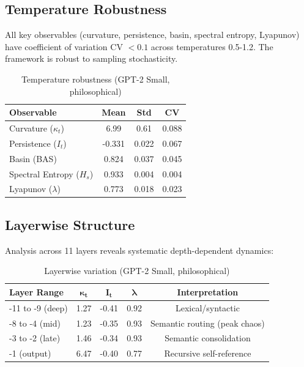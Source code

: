 \documentclass[12pt,a4paper]{article}
\begin{document}
\subsection{Temperature Robustness}

All key observables (curvature, persistence, basin, spectral entropy, Lyapunov) have coefficient of variation CV $< 0.1$ across temperatures 0.5-1.2. The framework is robust to sampling stochasticity.

\begin{table}[h]
\centering
\caption{Temperature robustness (GPT-2 Small, philosophical)}
\begin{tabular}{lccc}
\toprule
\textbf{Observable} & \textbf{Mean} & \textbf{Std} & \textbf{CV} \\
\midrule
Curvature ($\kappa_t$) & 6.99 & 0.61 & 0.088 \\
Persistence ($I_t$) & -0.331 & 0.022 & 0.067 \\
Basin (BAS) & 0.824 & 0.037 & 0.045 \\
Spectral Entropy ($H_s$) & 0.933 & 0.004 & 0.004 \\
Lyapunov ($\lambda$) & 0.773 & 0.018 & 0.023 \\
\bottomrule
\end{tabular}
\end{table}

\subsection{Layerwise Structure}

Analysis across 11 layers reveals systematic depth-dependent dynamics:

\begin{table}[h]
\centering
\caption{Layerwise variation (GPT-2 Small, philosophical)}
\begin{tabular}{lcccc}
\toprule
\textbf{Layer Range} & $\mathbf{\kappa_t}$ & $\mathbf{I_t}$ & $\mathbf{\lambda}$ & \textbf{Interpretation} \\
\midrule
-11 to -9 (deep) & 1.27 & -0.41 & 0.92 & Lexical/syntactic \\
-8 to -4 (mid) & 1.23 & -0.35 & 0.93 & Semantic routing (peak chaos) \\
-3 to -2 (late) & 1.46 & -0.34 & 0.93 & Semantic consolidation \\
-1 (output) & 6.47 & -0.40 & 0.77 & Recursive self-reference \\
\bottomrule
\end{tabular}
\end{table}
\end{document}
